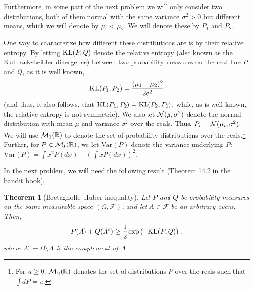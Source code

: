 \documentclass{article}
\newtheorem{theorem}{Theorem}
\newcommand{\R}{\mathbb{R}}
\DeclareMathOperator*{\1}{\mathbbm{1}}
\newcommand{\cF}{\mathcal{F}}
\theoremstyle{definition}
\theoremstyle{remark}
\begin{document}
Furthermore, in some part of the next problem we will only consider two distributions, both of them normal with the same variance $\sigma^2>0$ but different means, which we will denote by $\mu_1<\mu_2$. We will denote these by $P_1$ and $P_2$. 

One way to characterize how different these distributions are is by their relative entropy.
By letting $\mathrm{KL}(P,Q)$ denote the relative entropy (also known as the Kullback-Leibler divergence) between two probability measures on the real line $P$ and $Q$, 
as it is well known,
\begin{align}
\mathrm{KL}(P_1,P_2) = \frac{(\mu_1-\mu_2)^2}{2\sigma^2} \label{eq:klnormal}
\end{align}
(and thus, it also follows, that $\mathrm{KL}(P_1,P_2) = \mathrm{KL}(P_2,P_1)$, while, as is well known, the relative entropy is not symmetric).
We also let $\mathcal{N}(\mu,\sigma^2)$ denote the normal distribution with mean $\mu$ and variance $\sigma^2$ over the reals. Thus, $P_i = \mathcal{N}(\mu_i,\sigma^2)$.
We will use $\cM_1(\R)$ to denote the set of probability distributions over the reals.\footnote{For $u\ge 0$, 
$\cM_u(\R)$ denotes the set of distributions $P$ over the reals such that $\int dP = u$.}
Further, for $P\in \cM_1(\R)$, we let $\mathrm{Var}(P)$ denote the variance underlying $P$: 
$\mathrm{Var}(P) =\int x^2 P(dx) - (\int x P(dx))^2$.

In the next problem, we will need the following result (Theorem 14.2 in the bandit book).
\begin{theorem}[Bretagnolle--Huber inequality]
\label{thm:pinskerhp}
Let $P$ and $Q$ be probability measures on the same measurable space $(\Omega, \cF)$, and let $A \in \cF$ be an arbitrary event. Then,
\begin{align}\label{eq:pinskerhp}
P(A) + Q(A^c) \geq \frac{1}{2} \exp\left(-\mathrm{KL}(P, Q)\right)\,,
\end{align} 
where $A^c = \Omega \setminus A$ is the complement of $A$. 
\end{theorem} 
\end{document}
